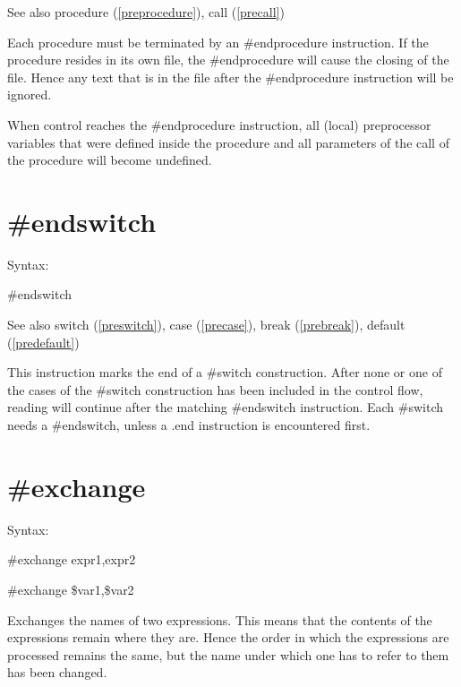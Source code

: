 \noindent See also procedure (\ref{preprocedure}), call
(\ref{precall})

\noindent Each procedure must be terminated by an 
\#endprocedure instruction. If the procedure resides 
in its own file, the \#endprocedure will cause the closing of the file. 
Hence any text that is in the file after the \#endprocedure instruction 
will be ignored.

When control reaches the \#endprocedure instruction, all (local) 
preprocessor variables that were defined 
inside the procedure and all parameters of the call of the procedure will 
become undefined.


\section{\#endswitch}
\label{preendswitch}

\noindent Syntax:

\#endswitch
 
\noindent See also switch (\ref{preswitch}),
        case (\ref{precase}),
        break (\ref{prebreak}),
        default (\ref{predefault})

\noindent This instruction marks the end of a 
\#switch construction. After none or one of the cases of 
the \#switch construction has been included in the control flow, reading 
will continue after the matching \#endswitch instruction. Each \#switch 
needs a \#endswitch, unless a .end instruction is encountered first.


\section{\#exchange}
\label{preexchange}

\noindent Syntax:

\#exchange expr1,expr2

\#exchange \$var1,\$var2

\noindent Exchanges the names of two 
expressions. This means that the contents of the 
expressions remain where they are. Hence the order in which the expressions 
are processed remains the same, but the name under which one has to refer 
to them has been changed.

